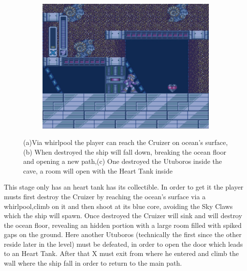\begin{figure}[h]
\begin{subfigure}{0.4\textwidth}
		\includegraphics[width=\linewidth]{figures/X1/Launch_octopus/Octopus_heart_3.jpg}
		\caption{}
	\end{subfigure}
	\caption{(a)Via whirlpool the player can reach the Cruizer on ocean's surface,(b) When destroyed the ship will fall down, breaking the ocean floor and opening a new path,(c) One destroyed the Utuboros inside the cave, a room will open with the Heart Tank inside}
\end{figure}
This stage only has an heart tank has its collectible. In order to get it the player musts first destroy the Cruizer by reaching the ocean's surface via a whirlpool,climb on it and then shoot at its blue core, avoiding the Sky Claws which the ship will spawn. Once destroyed the Cruizer will sink and will destroy the ocean floor, revealing an hidden portion with a large room filled with spiked gaps on the ground. Here another Utuboros (technically the first since the other reside later in the level) must be defeated, in order to open the door which leads to an Heart Tank. After that X must exit from where he entered and climb the wall where the ship fall in order to return to the main path.

